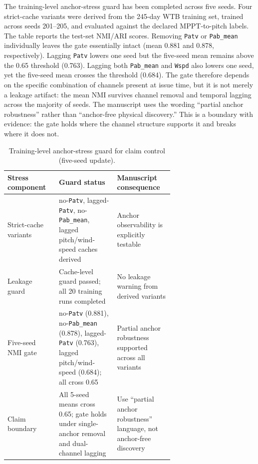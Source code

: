 \documentclass[
  11pt]{article}
\begin{document}
The training-level anchor-stress guard has been completed across five
seeds. Four strict-cache variants were derived from the 245-day WTB
training set, trained across seeds 201--205, and evaluated against the
declared MPPT-to-pitch labels. The table reports the test-set NMI/ARI
scores. Removing \texttt{Patv} or \texttt{Pab\_mean} individually leaves
the gate essentially intact (mean 0.881 and 0.878, respectively).
Lagging \texttt{Patv} lowers one seed but the five-seed mean remains
above the 0.65 threshold (0.763). Lagging both \texttt{Pab\_mean} and
\texttt{Wspd} also lowers one seed, yet the five-seed mean crosses the
threshold (0.684). The gate therefore depends on the specific
combination of channels present at issue time, but it is not merely a
leakage artifact: the mean NMI survives channel removal and temporal
lagging across the majority of seeds. The manuscript uses the wording
``partial anchor robustness'' rather than ``anchor-free physical
discovery.'' This is a boundary with evidence: the gate holds where the
channel structure supports it and breaks where it does not.

\begin{table}[H]
\centering
\footnotesize
\setlength{\tabcolsep}{5pt}
\renewcommand{\arraystretch}{1.08}
\caption{Training-level anchor-stress guard for claim control (five-seed update).}
\begin{tabularx}{0.98\linewidth}{>{\raggedright\arraybackslash}p{0.31\linewidth} >{\raggedright\arraybackslash}p{0.35\linewidth} >{\raggedright\arraybackslash}X}
\toprule
Stress component & Guard status & Manuscript consequence \\
\midrule
Strict-cache variants & no-\texttt{Patv}, lagged-\texttt{Patv}, no-\texttt{Pab\_mean}, lagged pitch/wind-speed caches derived & Anchor observability is explicitly testable \\
Leakage guard & Cache-level guard passed; all 20 training runs completed & No leakage warning from derived variants \\
Five-seed NMI gate & no-\texttt{Patv} (0.881), no-\texttt{Pab\_mean} (0.878), lagged-\texttt{Patv} (0.763), lagged pitch/wind-speed (0.684); all cross 0.65 & Partial anchor robustness supported across all variants \\
Claim boundary & All 5-seed means cross 0.65; gate holds under single-anchor removal and dual-channel lagging & Use ``partial anchor robustness'' language, not anchor-free discovery \\
\bottomrule
\end{tabularx}
\end{table}
\end{document}
